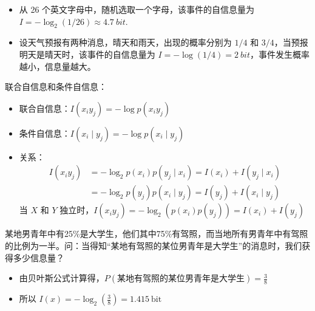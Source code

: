 \begin{remark}
    \text{}\begin{itemize}
        \item 从 26 个英文字母中，随机选取一个字母，该事件的自信息量为 $I=-\log _{2}(1 / 26) \approx \SI{4.7}{bit}$.
        \item 设天气预报有两种消息，晴天和雨天，出现的概率分别为 $1/4$ 和 $3/4$，当预报明天是晴天时，该事件的自信息量为 $I = -\log(1 / 4) = \SI{2}{bit}$，事件发生概率越小，信息量越大。
    \end{itemize}
\end{remark}

\begin{remark}
    联合自信息和条件自信息：
    \begin{itemize}
        \item 联合自信息：$I(x_i y_j) = -\log p(x_iy_j)$
        \item 条件自信息：$I(x_i \mid y_j) = -\log p(x_i \mid y_j)$
        \item 关系：\begin{align*}
            I(x_{i} y_{j})&=-\log _{2} p(x_{i}) p(y_{j} \mid x_{i})=I(x_{i})+I(y_{j} \mid x_{i}) \\
            &=-\log _{2} p(y_{j}) p(x_{i} \mid y_{j})=I(y_{j})+I(x_{i} \mid y_{j})
        \end{align*}
        当 $X$ 和 $Y$ 独立时，$I(x_{i} y_{j})=-\log _{2} (p(x_{i})p(y_{j}))=I(x_{i})+I(y_{j})$
    \end{itemize}
\end{remark}

\begin{remark}
    某地男青年中有25\%是大学生，他们其中75\%有驾照，而当地所有男青年中有驾照的比例为一半。问：当得知“某地有驾照的某位男青年是大学生”的消息时，我们获得多少信息量？
    \begin{itemize}
        \item 由贝叶斯公式计算得，$P(\text{某地有驾照的某位男青年是大学生}) = \frac{3}{8}$
        \item 所以 $I(x) = -\log_2(\frac{3}{8}) = \SI{1.415}{\mathrm{bit}}$ 
    \end{itemize}
\end{remark}

